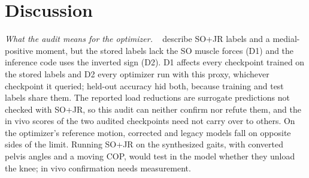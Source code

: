 \section{Discussion}\label{sec:discussion}
\textit{What the audit means for the optimizer.} \Chong{}~\citeChong{} describe SO+JR labels
and a medial-positive moment, but the stored labels lack the SO muscle forces (D1) and the
inference code uses the inverted sign (D2). D1 affects every checkpoint trained on the stored
labels and D2 every optimizer run with this proxy, whichever checkpoint it queried; held-out
accuracy hid both, because training and test labels share them. The reported load reductions are
surrogate predictions not checked with SO+JR, so this audit can neither confirm nor refute them,
and the in vivo scores of the two audited checkpoints need not carry over to others. On the
optimizer's reference motion, corrected and legacy models fall on opposite sides of the limit.
Running SO+JR on the synthesized gaits, with converted pelvis angles and a moving COP, would test in
the model whether they unload the knee; in vivo confirmation needs measurement.

